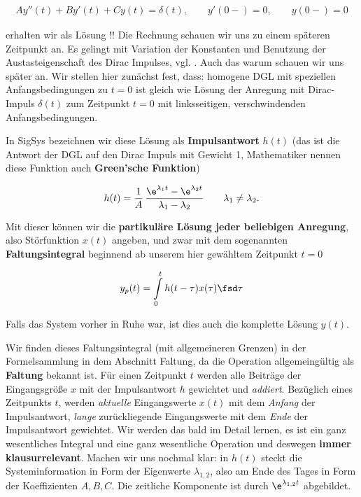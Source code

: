 \begin{mdframed}[backgroundcolor=C3!10]
\begin{align}
A y''(t) + B y'(t) + C y(t) = \delta(t),\qquad y'(0-) = 0,\qquad y(0-) = 0
\end{align}
\end{mdframed}
erhalten wir als Lösung !!
%
Die Rechnung schauen wir uns zu einem späteren Zeitpunkt an. Es gelingt mit Variation
der Konstanten und Benutzung der Austasteigenschaft des Dirac Impulses,
vgl. \cite[S.133ff]{Strang2014}.
%
Auch das warum schauen wir uns später an. Wir stellen hier zunächst fest, dass:
homogene DGL mit speziellen Anfangsbedingungen zu $t=0$ ist gleich wie
Lösung der Anregung mit Dirac-Impuls $\delta(t)$ zum Zeitpunkt $t=0$ mit
linksseitigen, verschwindenden Anfangsbedingungen.

In SigSys bezeichnen wir diese Lösung als \textbf{Impulsantwort} $h(t)$
(das ist die Antwort der DGL auf den Dirac Impuls mit Gewicht 1, Mathematiker
nennen diese Funktion auch \textbf{Green'sche Funktion})
\begin{mdframed}[backgroundcolor=C3!10]
\begin{align}
h(t) =
\frac{1}{A}\,\frac{\e^{\lambda_1 t} - \e^{\lambda_2 t}}{\lambda_1 - \lambda_2}
\qquad \lambda_1 \neq \lambda_2.
\end{align}
\end{mdframed}

\newpage
Mit dieser können wir die \textbf{partikuläre Lösung jeder beliebigen Anregung},
also Störfunktion $x(t)$ angeben, und zwar mit dem sogenannten
\textbf{Faltungsintegral} beginnend ab unserem hier gewähltem
Zeitpunkt $t=0$
%
\begin{mdframed}[backgroundcolor=C3!10]
\begin{equation}
y_p(t) = \int\limits_{0}^{t} h(t-\tau) x(\tau) \fsd \tau
\end{equation}
\end{mdframed}
%
Falls das System vorher in Ruhe war, ist dies auch die komplette Lösung $y(t)$.
%

Wir finden dieses Faltungsintegral (mit allgemeineren Grenzen) in der
Formelsammlung in dem Abschnitt Faltung, da die Operation allgemeingültig als
\textbf{Faltung} bekannt ist.
%
Für einen Zeitpunkt $t$ werden alle Beiträge der Eingangsgröße $x$ mit der Impulsantwort $h$
gewichtet und \textit{addiert}. Bezüglich eines Zeitpunkts $t$, werden \textit{aktuelle}
Eingangswerte $x(t)$ mit dem \textit{Anfang} der Impulsantwort, \textit{lange}
zurückliegende Eingangswerte mit dem \textit{Ende} der Impulsantwort gewichtet.
%
Wir werden das bald im Detail lernen, es ist ein ganz wesentliches Integral und
eine ganz wesentliche Operation und deswegen \textbf{immer klausurrelevant}.
%
Machen wir uns nochmal klar: in $h(t)$ steckt die Systeminformation in Form
der Eigenwerte $\lambda_{1,2}$, also am Ende des Tages in Form der Koeffizienten $A,B,C$.
Die zeitliche Komponente ist durch $\e^{\lambda_{1,2} t}$ abgebildet.

